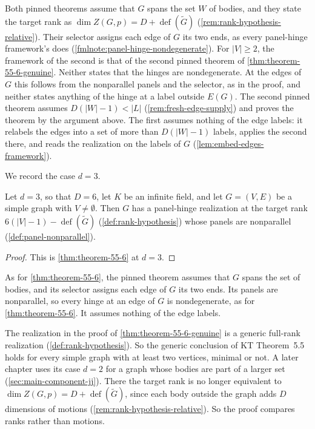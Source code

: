 \begin{fmlnote}
  Both pinned theorems assume that $G$ spans the set $W$ of bodies, and
  they state the target rank as
  $\dim Z(G,p) = D + \operatorname{def}(\tilde G)$
  (\cref{rem:rank-hypothesis-relative}). Their selector assigns each edge
  of $G$ its two ends, as every panel-hinge framework's does
  (\cref{fmlnote:panel-hinge-nondegenerate}). For $|V| \ge 2$, the
  framework of the second is that of the second pinned theorem of
  \cref{thm:theorem-55-6-genuine}. Neither states that the hinges are
  nondegenerate. At the edges of $G$ this follows from the nonparallel
  panels and the selector, as in the proof, and neither states anything
  of the hinge at a label outside $E(G)$. The second pinned theorem assumes
  $D(|W| - 1) < |L|$ (\cref{rem:fresh-edge-supply}) and proves the
  theorem by the argument above. The first assumes nothing of the edge
  labels: it relabels the edges into a set of more than $D(|W| - 1)$
  labels, applies the second there, and reads the realization on the
  labels of $G$ (\cref{lem:embed-edges-framework}).
\end{fmlnote}

We record the case $d = 3$.

\begin{theorem}[KT Theorem 5.6 at $d = 3$]
  \label{thm:theorem-55-6-d3}
  \leanok
  Let $d = 3$, so that $D = 6$, let $K$ be an infinite field, and let
  $G = (V, E)$ be a simple graph with $V \neq \emptyset$. Then $G$ has a
  panel-hinge realization at the target rank
  $6(|V| - 1) - \operatorname{def}(\tilde G)$ (\cref{def:rank-hypothesis})
  whose panels are nonparallel (\cref{def:panel-nonparallel}).
\end{theorem}
\begin{proof}
  \leanok
  This is \cref{thm:theorem-55-6} at $d = 3$.
\end{proof}

\begin{fmlnote}
  As for \cref{thm:theorem-55-6}, the pinned theorem assumes that $G$ spans
  the set of bodies, and its selector assigns each edge of $G$ its two
  ends. Its panels are nonparallel, so every hinge at an edge of $G$ is
  nondegenerate, as for \cref{thm:theorem-55-6}. It assumes nothing of
  the edge labels.
\end{fmlnote}

The realization in the proof of \cref{thm:theorem-55-6-genuine} is a
generic full-rank realization (\cref{def:rank-hypothesis}). So the generic
conclusion of KT Theorem~5.5 holds for every simple graph with at least two
vertices, minimal or not. A later chapter uses its case $d = 2$ for a
graph whose bodies are part of a larger set (\cref{sec:main-component-jj}).
There the target rank is no longer equivalent to
$\dim Z(G,p) = D + \operatorname{def}(\tilde G)$, since each body outside
the graph adds $D$ dimensions of motions
(\cref{rem:rank-hypothesis-relative}). So the proof compares ranks rather
than motions.

